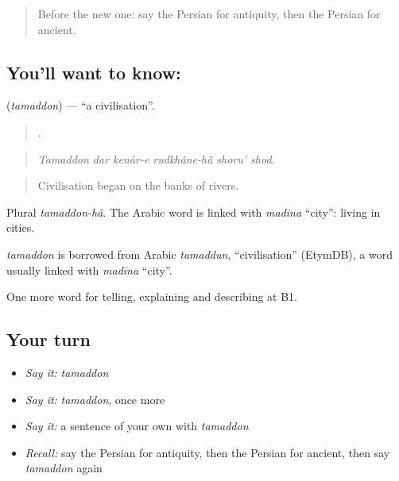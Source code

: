 \label{lesson:FA-C352-tamaddon}



\begin{quote}
Before the new one: say the Persian for antiquity, then the Persian for ancient.
\end{quote}

\subsection*{You'll want to know: }
\textbf{} (\emph{tamaddon}) — \textquotedblleft{}a civilisation\textquotedblright{}.

\begin{quote}
      .
\end{quote}

\begin{quote}
\emph{Tamaddon dar kenâr-e rudkhâne-hâ shoru' shod.}
\end{quote}

\begin{quote}
Civilisation began on the banks of rivers.
\end{quote}

Plural \emph{tamaddon-hâ}. The Arabic word is linked with \emph{madina} \textquotedblleft{}city\textquotedblright{}: living in cities.

\begin{cousinweb}
\emph{tamaddon} is borrowed from Arabic \emph{tamaddun}, \textquotedblleft{}civilisation\textquotedblright{} (EtymDB), a word usually linked with \emph{madīna} \textquotedblleft{}city\textquotedblright{}.
\end{cousinweb}

\begin{grammarlens}[title={What you've built}]
One more word for telling, explaining and describing at B1.
\end{grammarlens}

\subsection*{Your turn}
\begin{itemize}
\raggedright
  \item \emph{Say it:} \emph{tamaddon}
  \item \emph{Say it:} \emph{tamaddon}, once more
  \item \emph{Say it:} a sentence of your own with \emph{tamaddon}
  \item \emph{Recall:} say the Persian for antiquity, then the Persian for ancient, then say \emph{tamaddon} again
\end{itemize}

